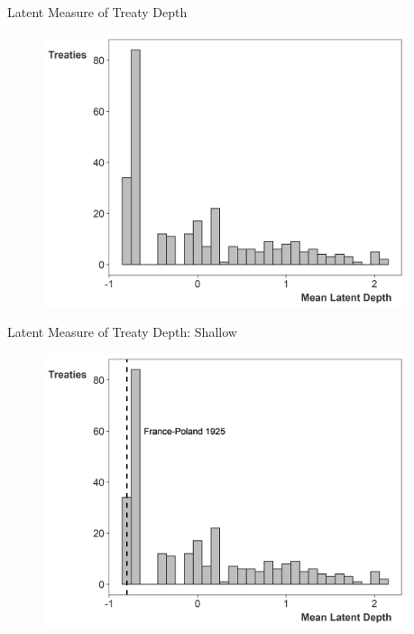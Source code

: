\documentclass[12pt]{beamer}
\begin{document}

\begin{frame}{Latent Measure of Treaty Depth}

\begin{figure}[htbp]
	\centering
		\includegraphics[width=0.95\textwidth]{ld-hist.png}
\end{figure}


\end{frame} 


\begin{frame}{Latent Measure of Treaty Depth: Shallow}

\begin{figure}[htbp]
	\centering
		\includegraphics[width=0.95\textwidth]{ld-hist-shallow.png}
\end{figure}


\end{frame} 
\end{document}
